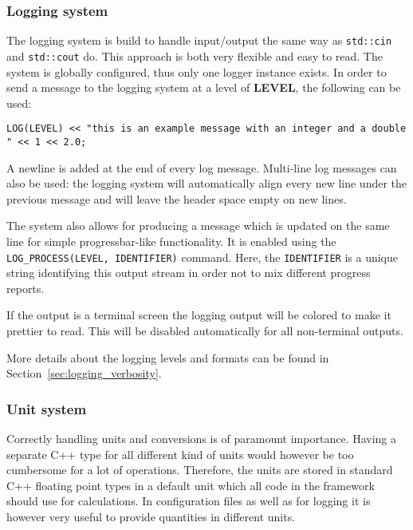 \subsubsection{Logging system}
\label{sec:logger}
The logging system is build to handle input/output the same way as \texttt{std::cin} and \texttt{std::cout} do.
This approach is both very flexible and easy to read.
The system is globally configured, thus only one logger instance exists.
In order to send a message to the logging system at a level of \textbf{LEVEL}, the following can be used:
\begin{verbatim}
LOG(LEVEL) << "this is an example message with an integer and a double " << 1 << 2.0;
\end{verbatim}
A newline is added at the end of every log message.
Multi-line log messages can also be used: the logging system will automatically align every new line under the previous message and will leave the header space empty on new lines.

The system also allows for producing a message which is updated on the same line for simple progressbar-like functionality.
It is enabled using the \texttt{LOG\_PROCESS(LEVEL, IDENTIFIER)} command.
Here, the \texttt{IDENTIFIER} is a unique string identifying this output stream in order not to mix different progress reports.

If the output is a terminal screen the logging output will be colored to make it prettier to read.
This will be disabled automatically for all non-terminal outputs.

More details about the logging levels and formats can be found in Section~\ref{sec:logging_verbosity}.

\subsubsection{Unit system}
\label{sec:unit_system}
Correctly handling units and conversions is of paramount importance.
Having a separate C++ type for all different kind of units would however be too cumbersome for a lot of operations.
Therefore, the units are stored in standard C++ floating point types in a default unit which all code in the framework should use for calculations.
In configuration files as well as for logging it is however very useful to provide quantities in different units.

